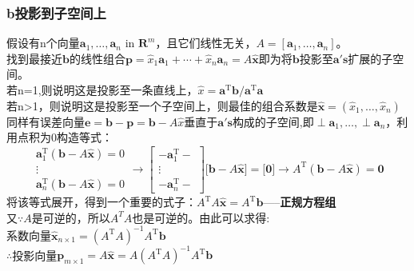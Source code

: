     \subsubsection{b投影到子空间上}
    假设有n个向量$\boldsymbol{a}_{1}, \ldots, \boldsymbol{a}_{n}$ in $\mathbf{R}^{m}$，且它们线性无关，$A=[\boldsymbol{a}_{1}, \ldots, \boldsymbol{a}_{n}]$。
    \\
    找到最接近$\bm{b}$的线性组合$\boldsymbol{p}=\widehat{x}_{1} \boldsymbol{a}_{1}+\cdots+\widehat{x}_{n} \boldsymbol{a}_{n}=A \widehat{\boldsymbol{x}}$即为将$\bm{b}$投影至$\bm{a's}$扩展的子空间。
    \\
    若n=1,则说明这是投影至一条直线上，$\widehat{x}=\boldsymbol{a}^{\mathrm{T}} \boldsymbol{b} / \boldsymbol{a}^{\mathrm{T}} \boldsymbol{a}$
    \\
    若n>1，则说明这是投影至一个子空间上，则最佳的组合系数是$\widehat{\boldsymbol{x}}=\left(\widehat{x}_{1}, \dots, \widehat{x}_{n}\right)$
    \\
    同样有误差向量$\bm{e}=\bm{b}-\bm{p}=\bm{b}-A \widehat{x}$垂直于$\bm{a's}$构成的子空间,即$\perp \boldsymbol{a}_{1}, \ldots, \perp \boldsymbol{a}_{n}$，利用点积为0构造等式：
    \\
    $$
    \begin{array}{c}
        \boldsymbol{a}_{1}^{\mathrm{T}}(\boldsymbol{b}-A \widehat{\boldsymbol{x}})=0\\
        \vdots  \\
        \boldsymbol{a}_{n}^{\mathrm{T}}(\boldsymbol{b}-A \widehat{\boldsymbol{x}})=0
    \end{array}
    \rightarrow
    \left[\begin{array}{c}{-\boldsymbol{a}_{1}^{\mathrm{T}}-} \\ {\vdots} \\ {-\boldsymbol{a}_{n}^{\mathrm{T}}-}\end{array}\right]\Bigg[\boldsymbol{b}-A \widehat{\boldsymbol{x}}\Bigg]=\Bigg[\mathbf{0}\Bigg]
    \rightarrow
    A^{\mathrm{T}}(\boldsymbol{b}-A \widehat{\boldsymbol{x}})=\mathbf{0}
    $$
    将该等式展开，得到一个重要的式子：$A^{\mathrm{T}} A \widehat{\boldsymbol{x}}=A^{\mathrm{T}} \boldsymbol{b}$-----\textbf{正规方程组}
    \\
    又$\because A$是可逆的，所以$A^T A$也是可逆的。由此可以求得:\\
    系数向量$\widehat{\bm{x}}_{n\times 1}=\left(A^{\mathrm{T}} A\right)^{-1} A^{\mathrm{T}} \boldsymbol{b}$
    \\
    $\therefore$投影向量$\bm{p}_{m\times 1}=A \widehat{\bm{x}}=A\left(A^{\mathrm{T}} A\right)^{-1} A^{\mathrm{T}} \bm{b}$
